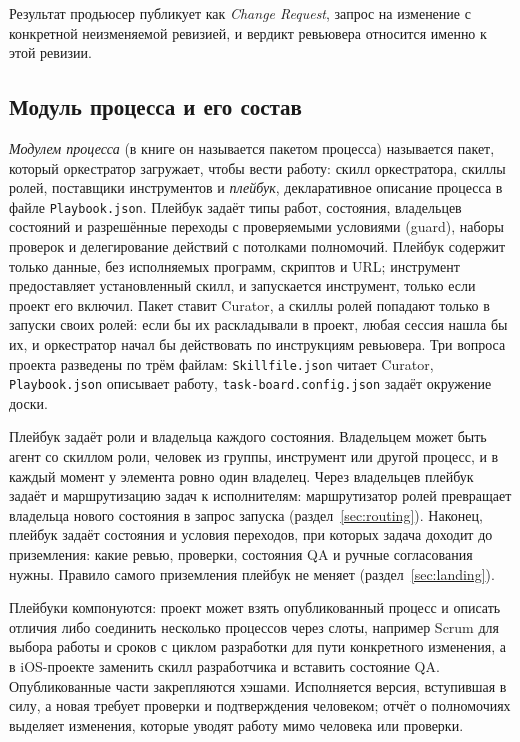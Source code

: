 \documentclass[10pt,a4paper]{article}
\begin{document}
Результат продьюсер публикует как \emph{Change Request}, запрос на изменение с конкретной неизменяемой ревизией, и вердикт ревьювера относится именно к этой ревизии.

\subsection{Модуль процесса и его состав}

\emph{Модулем процесса} (в книге \cite{swarmabook} он называется пакетом процесса) называется пакет, который оркестратор загружает, чтобы вести работу: скилл оркестратора, скиллы ролей, поставщики инструментов и \emph{плейбук}, декларативное описание процесса в файле \texttt{Playbook.json}. Плейбук задаёт типы работ, состояния, владельцев состояний и разрешённые переходы с проверяемыми условиями (guard), наборы проверок и делегирование действий с потолками полномочий. Плейбук содержит только данные, без исполняемых программ, скриптов и URL; инструмент предоставляет установленный скилл, и запускается инструмент, только если проект его включил. Пакет ставит Curator, а скиллы ролей попадают только в запуски своих ролей: если бы их раскладывали в проект, любая сессия нашла бы их, и оркестратор начал бы действовать по инструкциям ревьювера. Три вопроса проекта разведены по трём файлам: \texttt{Skillfile.json} читает Curator, \texttt{Playbook.json} описывает работу, \texttt{task-board.config.json} задаёт окружение доски.

Плейбук задаёт роли и владельца каждого состояния. Владельцем может быть агент со скиллом роли, человек из группы, инструмент или другой процесс, и в каждый момент у элемента ровно один владелец. Через владельцев плейбук задаёт и маршрутизацию задач к исполнителям: маршрутизатор ролей превращает владельца нового состояния в запрос запуска (раздел~\ref{sec:routing}). Наконец, плейбук задаёт состояния и условия переходов, при которых задача доходит до приземления: какие ревью, проверки, состояния QA и ручные согласования нужны. Правило самого приземления плейбук не меняет (раздел~\ref{sec:landing}).

Плейбуки компонуются: проект может взять опубликованный процесс и описать отличия либо соединить несколько процессов через слоты, например Scrum для выбора работы и сроков с циклом разработки для пути конкретного изменения, а в iOS-проекте заменить скилл разработчика и вставить состояние QA. Опубликованные части закрепляются хэшами. Исполняется версия, вступившая в силу, а новая требует проверки и подтверждения человеком; отчёт о полномочиях выделяет изменения, которые уводят работу мимо человека или проверки.
\end{document}
